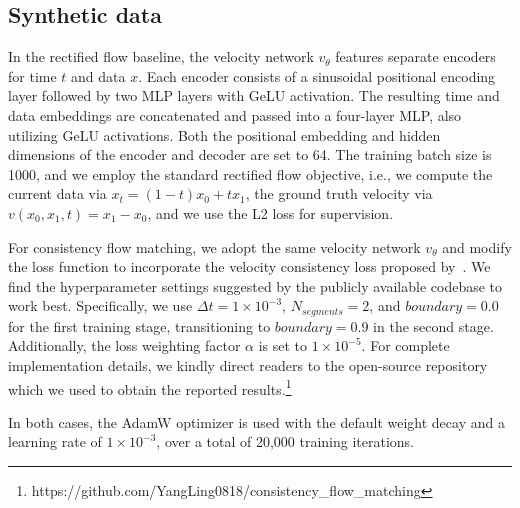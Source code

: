 \subsection{Synthetic data}
\label{app:implement_1d2d}

In the rectified flow baseline, the velocity network \(v_\theta\) features separate encoders for time \(t\) and data \(x\). Each encoder consists of a sinusoidal positional encoding layer followed by two MLP layers with GeLU activation. The resulting time and data embeddings are concatenated and passed into a four-layer MLP, also utilizing GeLU activations. Both the positional embedding and hidden dimensions of the encoder and decoder are set to 64. The training batch size is 1000, and we employ the standard rectified flow objective, i.e., we compute the current data via \(x_t = (1-t)x_0 + tx_1\), the ground truth velocity via \(v(x_0,x_1,t) = x_1 - x_0\), and we use the L2 loss for supervision. 

For consistency flow matching, we adopt the same velocity network \(v_\theta\) and modify the loss function to incorporate the velocity consistency loss proposed by~\citet{yang2024consistency}. We find the  hyperparameter settings suggested by the publicly available codebase to work best. Specifically, we use \(\Delta t = 1 \times 10^{-3}\), \(N_{\textit{segments}} = 2\), and \(\textit{boundary} = 0.0\) for the first training stage, transitioning to \(\textit{boundary} = 0.9\) in the second stage. Additionally, the loss weighting factor \(\alpha\) is set to \(1 \times 10^{-5}\). For complete implementation details, we kindly direct readers to the open-source repository which we used to obtain the reported results.\footnote{https://github.com/YangLing0818/consistency\_flow\_matching} 

In both cases, the AdamW optimizer is used with the default weight decay and a learning rate of \(1 \times 10^{-3}\), over a total of 20,000 training iterations.

